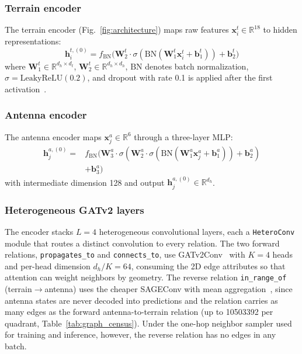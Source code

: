 \documentclass{ieeeaccess}
\begin{document}
\subsubsection{Terrain encoder}

The terrain encoder (Fig.~\ref{fig:architecture}) maps raw features $\mathbf{x}_i^t \in \mathbb{R}^{18}$ to hidden representations:
\begin{equation}
\mathbf{h}_i^{t,(0)} = f_{\text{BN}}\!\bigl(\mathbf{W}_2^t \cdot \sigma(\mathrm{BN}(\mathbf{W}_1^t \mathbf{x}_i^t + \mathbf{b}_1^t)) + \mathbf{b}_2^t\bigr)
\label{eq:terrain_enc}
\end{equation}
where $\mathbf{W}_1^t \in \mathbb{R}^{d_h \times d_t}$, $\mathbf{W}_2^t \in \mathbb{R}^{d_h \times d_h}$, $\mathrm{BN}$ denotes batch normalization, $\sigma = \mathrm{LeakyReLU}(0.2)$, and dropout with rate 0.1 is applied after the first activation~\cite{srivastava2014dropout}.

\subsubsection{Antenna encoder}

The antenna encoder maps $\mathbf{x}_j^a \in \mathbb{R}^{6}$ through a three-layer MLP:
\begin{equation}
\begin{split}
\mathbf{h}_j^{a,(0)} ={}& f_{\text{BN}}\!\bigl(\mathbf{W}_3^a \cdot \sigma(\mathbf{W}_2^a \cdot \sigma(\mathrm{BN}(\mathbf{W}_1^a \mathbf{x}_j^a + \mathbf{b}_1^a)) + \mathbf{b}_2^a) \\
&+ \mathbf{b}_3^a\bigr)
\end{split}
\label{eq:antenna_enc}
\end{equation}
with intermediate dimension 128 and output $\mathbf{h}_j^{a,(0)} \in \mathbb{R}^{d_h}$.

\subsubsection{Heterogeneous GATv2 layers}

The encoder stacks $L{=}4$ heterogeneous convolutional layers, each a \texttt{HeteroConv} module that routes a distinct convolution to every relation. The two forward relations, \texttt{propagates\_to} and \texttt{connects\_to}, use GATv2Conv~\cite{brody2022attentive} with $K{=}4$ heads and per-head dimension $d_h/K{=}64$, consuming the 2D edge attributes so that attention can weight neighbors by geometry. The reverse relation \texttt{in\_range\_of} (terrain$\to$antenna) uses the cheaper SAGEConv with mean aggregation~\cite{hamilton2017inductive}, since antenna states are never decoded into predictions and the relation carries as many edges as the forward antenna-to-terrain relation (up to \num{10503392} per quadrant, Table~\ref{tab:graph_census}). Under the one-hop neighbor sampler used for training and inference, however, the reverse relation has no edges in any batch.
\end{document}

